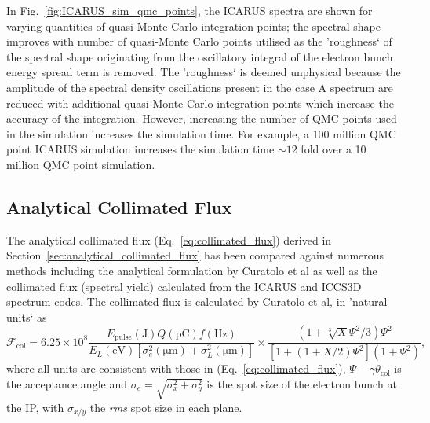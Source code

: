 \documentclass[../main.tex]{subfiles}
\begin{document}
In Fig.~\ref{fig:ICARUS_sim_qmc_points}, the \textsc{ICARUS} spectra are shown for varying quantities of quasi-Monte Carlo integration points; the spectral shape improves with number of quasi-Monte Carlo points utilised as the 'roughness` of the spectral shape  originating from the oscillatory integral of the electron bunch energy spread term is removed. The 'roughness` is deemed unphysical because the amplitude of the spectral density oscillations present in the case A spectrum are reduced with additional quasi-Monte Carlo integration points which increase the accuracy of the integration. However, increasing the number of QMC points used in the simulation increases the simulation time. For example, a 100 million QMC point \textsc{ICARUS} simulation increases the simulation time $\sim 12$ fold over a 10 million QMC point simulation.    

\subsection{Analytical Collimated Flux}
\label{sec:analytical_collimated_flux_benchmarking}

The analytical collimated flux (Eq.~\ref{eq:collimated_flux}) derived in Section~\ref{sec:analytical_collimated_flux} has been compared against numerous methods including the analytical formulation by Curatolo et al \cite{curatolo2017analytical} as well as the collimated flux (spectral yield) calculated from the \textsc{ICARUS} and \textsc{ICCS3D} \cite{krafft2016laser,ranjan2018simulation} spectrum codes. The collimated flux is calculated by Curatolo et al, in 'natural units` as 
\begin{equation}
\mathcal{F}_{\mathrm{col}} = 6.25\times 10^{8}\frac{E_{\mathrm{pulse}}\left(\mathrm{\si{\joule}}\right)Q\left(\si{\pico\coulomb}\right)f\left(\si{\hertz}\right)}{E_{L}\left(\si{\electronvolt}\right)\left[\sigma_{e}^{2}\left(\si{\micro\meter}\right)+\sigma_{L}^{2}\left(\si{\micro\meter}\right)\right]}\times\frac{\left(1+\sqrt[3]{X}\Psi^{2}/3\right)\Psi^{2}}{\left[1+\left(1+X/2\right)\Psi^{2}\right]\left(1+\Psi^{2}\right)},
\label{eq:curatolo_collimated_flux}
\end{equation}
where all units are consistent with those in (Eq.~\ref{eq:collimated_flux}), $\Psi-\gamma\theta_{\mathrm{col}}$ is the acceptance angle and $\sigma_{e} = \sqrt{\sigma_{x}^{2}+\sigma_{y}^{2}}$ is the  spot size of the electron bunch at the IP, with $\sigma_{x/y}$ the \textit{rms} spot size in each plane.
\end{document}
